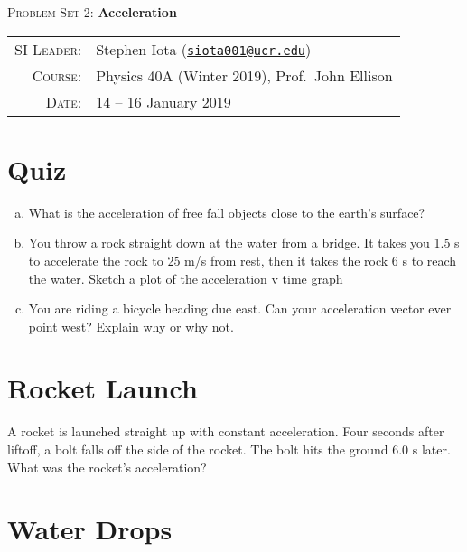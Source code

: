 \documentclass[11pt]{article}
\newcommand{\email}[1]{\texttt{\href{mailto:#1}{#1}}}
\begin{document}
\begin{center}

\Large{\textsc{Problem Set 2}: \textbf{Acceleration}}

\end{center}

\vspace{.5mm}



\begin{tabular}{rl}
\textsc{SI Leader}:
&
Stephen Iota (\email{siota001@ucr.edu})
\\
\textsc{Course}:
&
Physics 40A (Winter 2019), Prof.~John Ellison
\\
\textsc{Date}:
&
14 -- 16 January 2019
\end{tabular}



\section{Quiz}

\begin{enumerate}[(a)]
	\item What is the acceleration of free fall objects close to the earth's surface?
	\vspace{-1mm}
	\item You throw a rock straight down at the water from a bridge. It takes you 1.5 s to accelerate the rock to 25 m/s from rest, then it takes the rock 6 s to reach the water. Sketch a plot of the acceleration v time graph
	\vspace{-1mm}
	\item You are riding a bicycle heading due east. Can your acceleration vector ever point west? Explain why or why not.
	\vspace{-1mm}
\end{enumerate}



\section{Rocket Launch}

A rocket is launched straight up with constant acceleration. Four seconds after liftoff, a bolt falls off the side of the rocket. The bolt hits the ground 6.0 s later. 
What was the rocket's acceleration?

\section{Water Drops}
\end{document}
